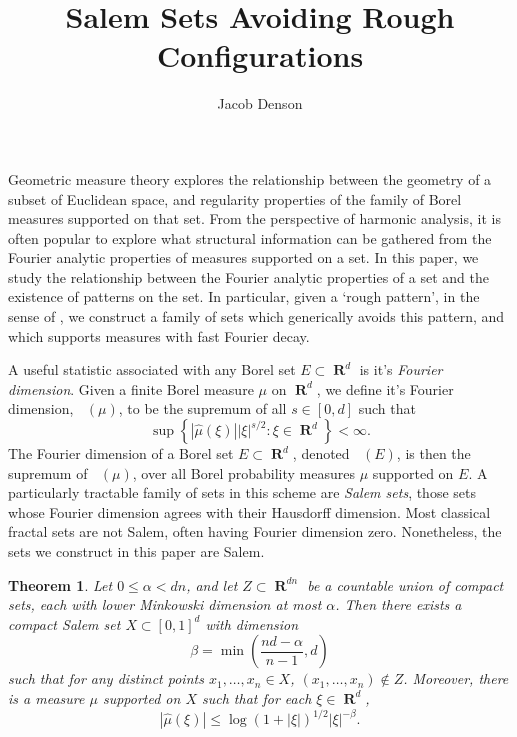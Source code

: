 \documentclass[12pt,reqno]{article}
\title{Salem Sets Avoiding Rough Configurations}
\author{Jacob Denson}
\DeclareMathOperator{\fordim}{\dim_{\mathbf{F}}}
\DeclareMathOperator{\RR}{\mathbf{R}}
\newtheorem{theorem}{Theorem}
\begin{document}
\maketitle

Geometric measure theory explores the relationship between the geometry of a subset of Euclidean space, and regularity properties of the family of Borel measures supported on that set. From the perspective of harmonic analysis, it is often popular to explore what structural information can be gathered from the Fourier analytic properties of measures supported on a set. In this paper, we study the relationship between the Fourier analytic properties of a set and the existence of patterns on the set. In particular, given a `rough pattern', in the sense of \cite{OurPaper}, we construct a family of sets which generically avoids this pattern, and which supports measures with fast Fourier decay.

A useful statistic associated with any Borel set $E \subset \RR^d$ is it's \emph{Fourier dimension}. Given a finite Borel measure $\mu$ on $\RR^d$, we define it's Fourier dimension, $\fordim(\mu)$, to be the supremum of all $s \in [0,d]$ such that
%
\begin{equation} \label{fordim}
    \sup \left\{ |\widehat{\mu}(\xi)| |\xi|^{s/2} : \xi \in \RR^d \right\} < \infty.
\end{equation}
%
The Fourier dimension of a Borel set $E \subset \RR^d$, denoted $\fordim(E)$, is then the supremum of $\fordim(\mu)$, over all Borel probability measures $\mu$ supported on $E$. A particularly tractable family of sets in this scheme are \emph{Salem sets}, those sets whose Fourier dimension agrees with their Hausdorff dimension. Most classical fractal sets are not Salem, often having Fourier dimension zero. Nonetheless, the sets we construct in this paper are Salem.

\begin{theorem} \label{maintheorem}
    Let $0 \leq \alpha < dn$, and let $Z \subset \RR^{dn}$ be a countable union of compact sets, each with lower Minkowski dimension at most $\alpha$. Then there exists a compact Salem set $X \subset [0,1]^d$ with dimension
    \[ \beta = \min \left( \frac{nd - \alpha}{n-1}, d \right) \]
    such that for any distinct points $x_1, \dots, x_n \in X$, $(x_1, \dots, x_n) \not \in Z$. Moreover, there is a measure $\mu$ supported on $X$ such that for each $\xi \in \RR^d$,
    \[ |\widehat{\mu}(\xi)| \leq \log(1 + |\xi|)^{1/2} |\xi|^{-\beta}. \]
\end{theorem}
\end{document}
